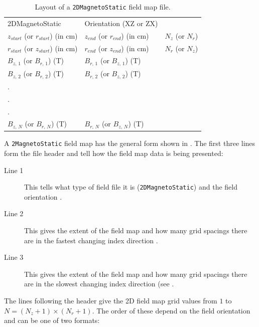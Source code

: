 \begin{table}[h!]
    \caption{Layout of a \texttt{2DMagnetoStatic} field map file.}
    \label{tab:2DMagnetoStatic}
    \begin{center}
    \begin{tabular}{lll}
      \hline
      2DMagnetoStatic & Orientation (XZ or ZX) & \\
      $z_{start}$ (or $r_{start}$) (in cm) & $z_{end}$ (or $r_{end}$) (in cm) & $N_{z}$ (or $N_{r}$) \\
      $r_{start}$ (or $z_{start}$) (in cm) & $r_{end}$ (or $z_{end}$) (in cm) & $N_{r}$ (or $N_{z}$) \\
      $B_{z,\,1}$ (or $B_{r,\,1}$) (T) & $B_{r,\,1}$ (or $B_{z,\,1}$) (T)& \\
      $B_{z,\,2}$ (or $B_{r,\,2}$) (T) & $B_{r,\,2}$ (or $B_{z,\,2}$) (T)& \\
      . & & \\
      . & & \\
      . & & \\
      $B_{z,\,N}$ (or $B_{r,\,N}$) (T) & $B_{r,\,N}$ (or $B_{z,\,N}$) (T)& \\
      \hline
    \end{tabular}
    \end{center}
\end{table}

A \texttt{2MagnetoStatic} field map has the general form shown in . The first three lines form
the file header and tell \opalt how the field map data is being presented:

\begin{description}
\item[Line 1] This tells \opalt what type of field file it is (\texttt{2DMagnetoStatic}) and the field orientation
  .
\item[Line 2] This gives the extent of the field map and how many grid spacings there are in the fastest changing
  index direction .
\item[Line 3] This gives the extent of the field map and how many grid spacings there are in the slowest changing
  index direction (see .
\end{description}

The lines following the header give the 2D field map grid values from $1$ to $N = (N_{z} + 1) \times (N_{r} + 1)$.
The order of these depend on the field orientation  and can be one of two formats:

